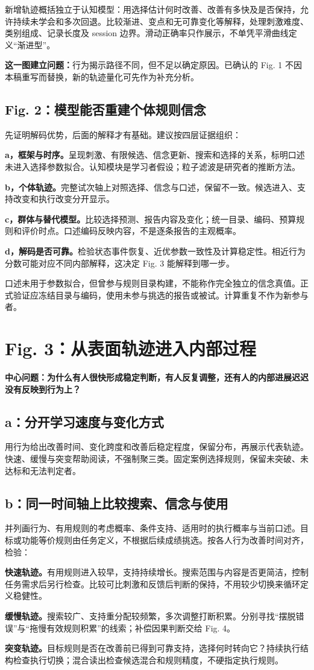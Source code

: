 \documentclass[12pt]{article}
\newcommand{\idea}[2]{\par\Needspace{3\baselineskip}\noindent\textbf{#1。}#2\par}
\begin{document}
新增轨迹概括独立于认知模型：用选择估计何时改善、改善有多快及是否保持，允许持续未学会和多次回退。比较渐进、变点和无可靠变化等解释，处理刺激难度、类别组成、记录长度及 session 边界。滑动正确率只作展示，不单凭平滑曲线定义“渐进型”。

\textbf{这一图建立问题：}行为揭示路径不同，但不足以确定原因。已确认的 Fig. 1 不因本稿重写而替换，新的轨迹量化可先作为补充分析。

\subsection{Fig. 2：模型能否重建个体规则信念}
先证明解码优势，后面的解释才有基础。建议按四层证据组织：
\idea{a，框架与时序}{呈现刺激、有限候选、信念更新、搜索和选择的关系，标明口述未进入选择参数拟合。认知模块是学习者假设；粒子滤波是研究者的推断方法。}
\idea{b，个体轨迹}{完整试次轴上对照选择、信念与口述，保留不一致。候选进入、支持改变和执行改变分开显示。}
\idea{c，群体与替代模型}{比较选择预测、报告内容及变化；统一目录、编码、预算规则和评价时点。口述编码反映内容，不是逐条报告的主观概率。}
\idea{d，解码是否可靠}{检验状态事件恢复、近优参数一致性及计算稳定性。相近行为分数可能对应不同内部解释，这决定 Fig. 3 能解释到哪一步。}

口述未用于参数拟合，但曾参与规则目录构建，不能称作完全独立的信念真值。正式验证应冻结目录与编码，使用未参与挑选的报告或被试。计算重复不作为新参与者。

\section{Fig. 3：从表面轨迹进入内部过程}
\textbf{中心问题：为什么有人很快形成稳定判断，有人反复调整，还有人的内部进展迟迟没有反映到行为上？}

\subsection{a：分开学习速度与变化方式}
用行为给出改善时间、变化跨度和改善后稳定程度，保留分布，再展示代表轨迹。快速、缓慢与突变帮助阅读，不强制聚三类。固定案例选择规则，保留未突破、未达标和无法判定者。

\subsection{b：同一时间轴上比较搜索、信念与使用}
并列画行为、有用规则的考虑概率、条件支持、适用时的执行概率与当前口述。目标或功能等价规则由任务定义，不根据后续成绩挑选。按各人行为改善时间对齐，检验：
\idea{快速轨迹}{有用规则进入较早，支持持续增长。搜索范围与内容是否更简洁，控制任务需求后另行检查。比较可比刺激和反馈后判断的保持，不用较少切换来循环定义稳健性。}
\idea{缓慢轨迹}{搜索较广、支持重分配较频繁，多次调整打断积累。分别寻找“摆脱错误”与“拖慢有效规则积累”的线索；补偿因果判断交给 Fig. 4。}
\idea{突变轨迹}{目标规则是否在改善前已得到可靠支持，选择何时转向它？持续执行结构检查执行切换；混合读出检查候选混合和规则精度，不硬指定执行规则。}
\end{document}
